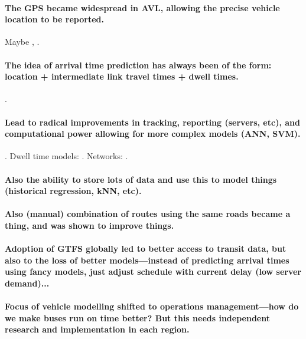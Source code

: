 \paragraph{The GPS became widespread in AVL, allowing the precise vehicle location to be reported.}
Maybe \cite{Dailey_2001},
\cite{Cathey_2003,Shalaby_2004,Jeong_2005,TCRP_2003,TCRP_2003b}.


\paragraph{The idea of arrival time prediction has always been of the form: location + intermediate link travel times + dwell times.}
\cite{Reinhoudt_1997,Wall_1999,Dailey_2001,Cathey_2003,Shalaby_2004,Jong_2005,Yu_2006}.


\paragraph{Lead to radical improvements in tracking, reporting (servers, etc), and computational power allowing for more complex models (ANN, SVM).}
\cite{Chang_2010,Yu_2006,Yu_2010,Yu_2011,Gong_2013,Yin_2017,Mazloumi_2011}.
Dwell time models:
\cite{Shen_2013,Wang_2016,Meng_2013,Robinson_2013}.
Networks: \cite{Celan_2018,Celan_2017}.


\paragraph{Also the ability to store lots of data and use this to model things (historical regression, kNN, etc).}
\cite{Julio_2016}


\paragraph{Also (manual) combination of routes using the same roads became a thing, and was shown to improve things.}


\paragraph{Adoption of GTFS globally led to better access to transit data, but also to the loss of better models---instead of predicting arrival times using fancy models, just adjust schedule with current delay (low server demand)...}


\paragraph{Focus of vehicle modelling shifted to operations management---how do we make buses run on time better? But this needs independent research and implementation in each region.}


